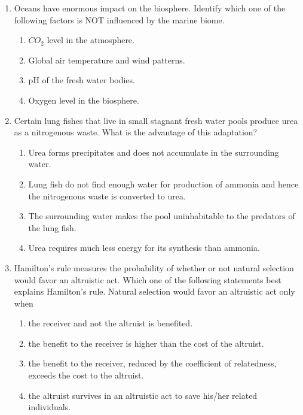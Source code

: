 \documentclass[journal,12pt,onecolumn]{IEEEtran}
\theoremstyle{remark}
\begin{document}
\begin{enumerate}
    \item Oceans have enormous impact on the biosphere. Identify which one of the following factors is NOT influenced by the marine biome.

    \hfill{}
    \begin{enumerate}
        \item $CO_2$ level in the atmosphere.
        \item Global air temperature and wind patterns.
        \item pH of the fresh water bodies.
        \item Oxygen level in the biosphere.
    \end{enumerate}

    \item Certain lung fishes that live in small stagnant fresh water pools produce urea as a nitrogenous waste. What is the advantage of this adaptation?

    \hfill{}
    \begin{enumerate}
        \item Urea forms precipitates and does not accumulate in the surrounding water.
        \item Lung fish do not find enough water for production of ammonia and hence the nitrogenous waste is converted to urea.
        \item The surrounding water makes the pool uninhabitable to the predators of the lung fish.
        \item Urea requires much less energy for its synthesis than ammonia.
    \end{enumerate}

    \item Hamilton's rule measures the probability of whether or not natural selection would favor an altruistic act. Which one of the following statements best explains Hamilton's rule. Natural selection would favor an altruistic act only when

    \hfill{}
    \begin{enumerate}
        \item the receiver and not the altruist is benefited.
        \item the benefit to the receiver is higher than the cost of the altruist.
        \item the benefit to the receiver, reduced by the coefficient of relatedness, exceeds the cost to the altruist.
        \item the altruist survives in an altruistic act to save his/her related individuals.
    \end{enumerate}


\end{enumerate}
\end{document}
